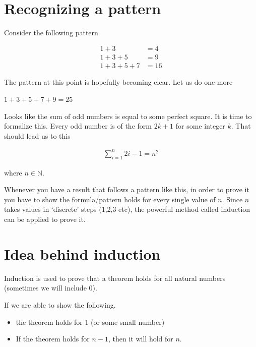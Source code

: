 \documentclass[12pt]{article}
\begin{document}
\begin{center}
\\
\vspace{1cm}
\end{center}

\vspace{0.5cm}\noindent


\section*{Recognizing a pattern}

Consider the following pattern

\begin{align*}
 1 + 3 &= 4 \\
 1 + 3 +  5 &= 9 \\
 1 + 3 + 5 + 7 &= 16
\end{align*}


The pattern at this point is hopefully becoming clear. Let us do one more

$1 + 3 + 5 + 7 + 9 = 25$

Looks like the sum of odd numbers is equal to some perfect square. It is time to formalize this.
Every odd number is of the form $2k + 1$ for some integer $k$. That should lead us to this

\begin{align*}
\sum_{i=1}^n 2i - 1 = n^2
\end{align*}

where $n \in \mathbb{N}$.

Whenever you have a result that follows a pattern like this, in order to prove it you have to show the formula/pattern holds for every single value of $n$. Since $n$ takes values in `discrete' steps (1,2,3 etc), the powerful method called induction can be applied to prove it.
 
\section*{Idea behind induction}
Induction is used to prove that a theorem holds for all natural numbers (sometimes we will include 0). 

If we are able to show the following. 

\begin{itemize}
\item the theorem holds for 1 (or some small number)
\item If the theorem holds for $n-1$, then it will hold for $n$.
\end{itemize}
\end{document}
